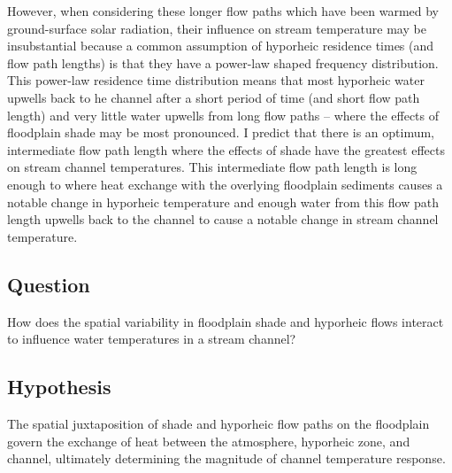 \documentclass[a4paper]{article}
\begin{document}
However, when considering these longer flow paths which have been warmed by ground-surface solar radiation, their influence on stream temperature may be insubstantial because a common assumption of hyporheic residence times (and flow path lengths) is that they have a power-law shaped frequency distribution. This power-law residence time distribution means that most hyporheic water upwells back to  he channel after a short period of time (and short flow path length) and very little water upwells from long flow paths -- where the effects of floodplain shade may be most pronounced. I predict that there is an optimum, intermediate flow path length where the effects of shade have the greatest effects on stream channel temperatures. This intermediate flow path length is long enough to where heat exchange with the overlying floodplain sediments causes a notable change in hyporheic temperature and enough water from this flow path length upwells back to the channel to cause a notable change in stream channel temperature.

\subsection*{Question}
How does the spatial variability in floodplain shade and hyporheic flows interact to influence water temperatures in a stream channel?

\subsection*{Hypothesis}

The spatial juxtaposition of shade and hyporheic flow paths on the floodplain govern the exchange of heat between the atmosphere, hyporheic zone, and channel, ultimately determining the magnitude of channel temperature response.
\end{document}
